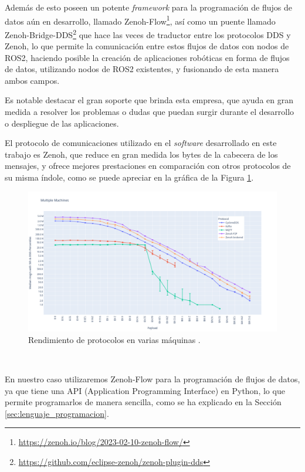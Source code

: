 Además de esto poseen un potente \textit{framework} para la programación de
flujos de datos aún en desarrollo, llamado
Zenoh-Flow\footnote{\url{https://zenoh.io/blog/2023-02-10-zenoh-flow/}}, así
como un puente llamado
Zenoh-Bridge-DDS\footnote{\url{https://github.com/eclipse-zenoh/zenoh-plugin-dds}}
que hace las veces de traductor entre los protocolos DDS y Zenoh, lo que permite
la comunicación entre estos flujos de datos con nodos de ROS2, haciendo posible
la creación de aplicaciones robóticas en forma de flujos de datos, utilizando
nodos de ROS2 existentes, y fusionando de esta manera ambos campos.

Es notable destacar el gran soporte que brinda esta empresa, que ayuda en gran
medida a resolver los problemas o dudas que puedan surgir durante el desarrollo o
despliegue de las aplicaciones.

El protocolo de comunicaciones utilizado en el \textit{software} desarrollado en
este trabajo es Zenoh, que reduce en gran medida los bytes de la cabecera de los
mensajes, y ofrece mejores prestaciones en comparación con otros protocolos de
su misma índole, como se puede apreciar en la gráfica de la Figura
\ref{fig:zenoh_performance}.

\begin{figure} [h!]
  \begin{center}
    \includegraphics[width=15cm]{figs/zenoh_performance}
  \end{center}
  \caption{Rendimiento de protocolos en varias máquinas \cite{zenoh_performance}.}
  \label{fig:zenoh_performance}
\end{figure}\

En nuestro caso utilizaremos Zenoh-Flow para la programación de flujos de datos,
ya que tiene una API (Application Programming Interface) en Python, lo que
permite programarlos de manera sencilla, como se ha explicado en la Sección
\ref{sec:lenguaje_programacion}.


